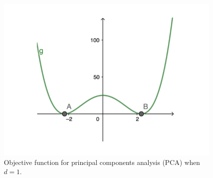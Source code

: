 \begin{figure}[H]
    \centering
    \includegraphics[scale = 0.4]{figures/pca.png}
    \caption{Objective function for principal components analysis (PCA) when $d = 1$.}
    \label{lec10:fig:pca_objective}
\end{figure}

